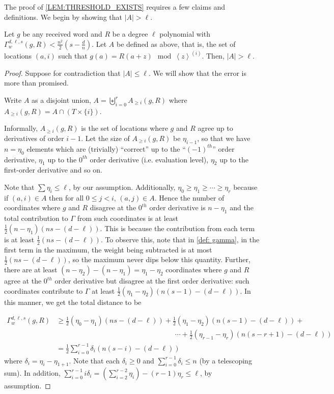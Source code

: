 \documentclass{article}
\def\abs#1{\left| #1 \right|}
\newcommand{\ip}[1]{\left\langle #1 \right\rangle}
\begin{document}
	The proof of \cref{LEM:THRESHOLD_EXISTS} requires a few claims and
	definitions. We begin by showing that $|A|>\ell$.
	
	\begin{claim} \label{clm: size of A}
		Let $g$ be any received word and $R$ be a degree $\ell$ polynomial with $\Gamma_w^{d, \ell, s} (g, R) < \frac{n^2}{2}(s-\frac{d}{n})$.  Let $A$ be defined as above, that is, the set of locations $(a,i)$ such
		that $g(a)=R(a+z) \mod \ip{z}^{(i)}$.  Then, $\abs{A} > \ell$. 
	\end{claim}
	
	\begin{proof}
		Suppose for contradiction that $\abs{A} \leq \ell$. We will show that the error is more than promised.
		
		Write $A$ as a disjoint union, $A = \biguplus_{i = 0}^{r} A_{\geq i}(g, R)$ where $A_{\geq i}(g,R)=A\cap (T\times \{i\})$.
		
		Informally, $A_{\geq i}(g, R)$ is the set of locations where $g$ and $R$ agree up to derivatives of order $i-1$. Let the size of $A_{\geq i}(g, R)$ be $\eta_{i-1}$, so that we have $n = \eta_0$ elements which are (trivially) ``correct'' up to the ``$(-1)^{th}$'' order derivative, $\eta_1$ up to the $0^{th}$ order derivative (i.e. evaluation level), $\eta_2$ up to the first-order derivative and so on.
		
		Note that $\sum \eta_i \leq \ell$, by our assumption. 
		Additionally, $\eta_0 \geq \eta_1 \geq \dotsb \geq \eta_{r}$ because if $(a,i) \in A$ then for all $0 \leq j<i$, $(a,j)\in A$.
		Hence the number of coordinates where $g$ and $R$ disagree at the $0^{th}$ order derivative is $n-\eta_1$ and the total contribution to $\Gamma$ from such coordinates is at least $\frac{1}{2}(n-\eta_1)(ns-(d-\ell))$. This is because the contribution from each term is at least $\frac12(ns-(d-\ell))$. To observe this, note that in \cref{def: gamma}, in the first term in the maximum, the weight being subtracted is at most $\frac{1}{2}(ns-(d-\ell))$, so the maximum never dips below this quantity. Further, there are at least  $(n-\eta_2)-(n-\eta_1)=\eta_1-\eta_2$ coordinates where $g$ and $R$ agree at the $0^{th}$ order derivative but disagree at the first order derivative: such coordinates contribute to $\Gamma$ at least $\frac{1}{2}(\eta_1-\eta_2)(n(s-1)-(d-\ell))$. In this manner, we get the total distance to be 
		
		\[  
		\begin{split}
			\Gamma_w^{d, \ell, s} (g, R) & \geq \frac{1}{2}(\eta_0-\eta_1)(ns-(d-\ell)) + \frac{1}{2}(\eta_1-\eta_2)(n(s-1)-(d-\ell)) + \\
			&  \hspace{7cm} \dotsb + \frac{1}{2}(\eta_{r-1}-\eta_{r})(n(s-r+1)-(d-\ell))\\
			& = \frac{1}{2} \sum_{i=0}^{r-1} \delta_i ( n(s-i) - (d-\ell)) 
		\end{split}
		\]
		where $\delta_i = \eta_{i} - \eta_{1+1}$. Note that each $\delta_i \geq 0$ and $\sum_{i=0}^{r-1} \delta_i 
		\leq n$ (by a telescoping sum). In addition, $\sum_{i=0}^{r-1} i \delta_i =  (\sum_{i=2}^{r-2} \eta_i)-(r-1)\eta_{r}  \leq \ell$, by assumption. 
		

\end{proof}
\end{document}

